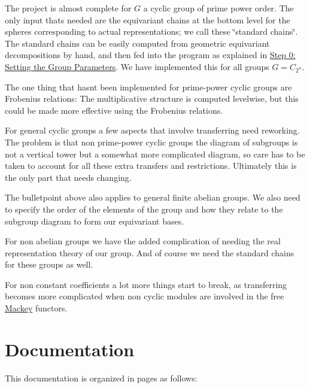 \begin{DoxyItemize}
\item The project is almost complete for $G$ a cyclic group of prime power order. The only input that\textquotesingle{}s needed are the equivariant chains at the bottom level for the spheres corresponding to actual representations; we call these \char`\"{}standard chains\char`\"{}. The standard chains can be easily computed from geometric equivariant decompositions by hand, and then fed into the program as explained in \hyperlink{use_how}{Step 0\+: Setting the Group Parameters}. We have implemented this for all groups $G=C_{2^n}$.
\item The one thing that hasn\textquotesingle{}t been implemented for prime-\/power cyclic groups are Frobenius relations\+: The multiplicative structure is computed levelwise, but this could be made more effective using the Frobenius relations.
\item For general cyclic groups a few aspects that involve transferring need reworking. The problem is that non prime-\/power cyclic groups the diagram of subgroups is not a vertical tower but a somewhat more complicated diagram, so care has to be taken to account for all these extra transfers and restrictions. Ultimately this is the only part that needs changing.
\item The bulletpoint above also applies to general finite abelian groups. We also need to specify the order of the elements of the group and how they relate to the subgroup diagram to form our equivariant bases.
\item For non abelian groups we have the added complication of needing the real representation theory of our group. And of course we need the standard chains for these groups as well.
\item For non constant coefficients a lot more things start to break, as transferring becomes more complicated when non cyclic modules are involved in the free \hyperlink{namespaceMackey}{Mackey} functors.
\end{DoxyItemize}\hypertarget{index_doc}{}\section{Documentation}\label{index_doc}
This documentation is organized in pages as follows\+:


